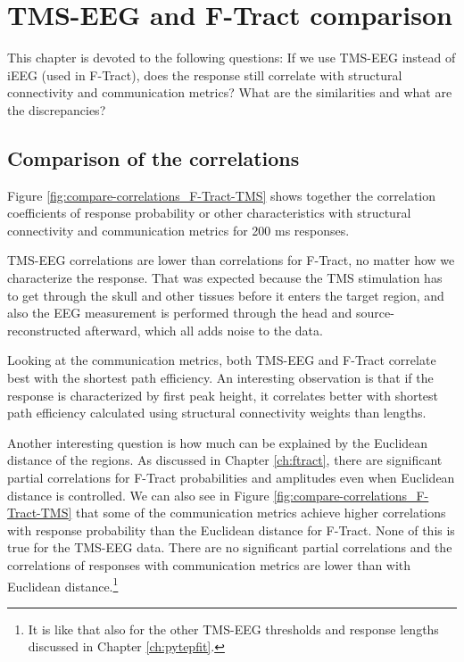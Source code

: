 \chapter{TMS-EEG and F-Tract comparison}\label{ch:compare}

This chapter is devoted to the following questions: If we use TMS-EEG instead of iEEG (used in F-Tract), does the response still correlate with structural connectivity and communication metrics?  What are the similarities and what are the discrepancies? 

\section{Comparison of the correlations}\label{sec:compare-correlations_F-Tract-TMS}

Figure \ref{fig:compare-correlations_F-Tract-TMS} shows together the correlation coefficients of response probability or other characteristics with structural connectivity and communication metrics for 200 ms responses. 

TMS-EEG correlations are lower than correlations for F-Tract, no matter how we characterize the response. That was expected because the TMS stimulation has to get through the skull and other tissues before it enters the target region, and also the EEG measurement is performed through the head and source-reconstructed afterward, which all adds noise to the data.

Looking at the communication metrics, both TMS-EEG and F-Tract correlate best with the shortest path efficiency. An interesting observation is that if the response is characterized by first peak height, it correlates better with shortest path efficiency calculated using structural connectivity weights than lengths.

Another interesting question is how much can be explained by the Euclidean distance of the regions. As discussed in Chapter \ref{ch:ftract}, there are significant partial correlations for F-Tract probabilities and amplitudes even when Euclidean distance is controlled. We can also see in Figure \ref{fig:compare-correlations_F-Tract-TMS} that some of the communication metrics achieve higher correlations with response probability than the Euclidean distance for F-Tract. None of this is true for the TMS-EEG data. There are no significant partial correlations and the correlations of responses with communication metrics are lower than with Euclidean distance.\footnote{It is like that also for the other TMS-EEG thresholds and response lengths discussed in Chapter \ref{ch:pytepfit}.} 

